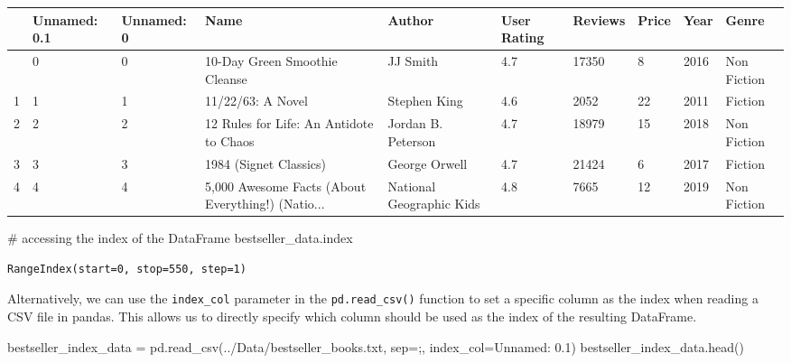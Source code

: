 \documentclass[
  letterpaper,
  DIV=11,
  numbers=noendperiod]{scrreprt}
\newenvironment{Shaded}{\begin{snugshade}}{\end{snugshade}}
\newcommand{\CommentTok}[1]{\textcolor[rgb]{0.37,0.37,0.37}{#1}}
\newcommand{\NormalTok}[1]{\textcolor[rgb]{0.00,0.23,0.31}{#1}}
\newcommand{\OperatorTok}[1]{\textcolor[rgb]{0.37,0.37,0.37}{#1}}
\newcommand{\StringTok}[1]{\textcolor[rgb]{0.13,0.47,0.30}{#1}}
\begin{document}
\begin{longtable}[]{@{}llllllllll@{}}
\toprule\noalign{}
& Unnamed: 0.1 & Unnamed: 0 & Name & Author & User Rating & Reviews &
Price & Year & Genre \\
\midrule\noalign{}
\endhead
\bottomrule\noalign{}
\endlastfoot
0 & 0 & 0 & 10-Day Green Smoothie Cleanse & JJ Smith & 4.7 & 17350 & 8 &
2016 & Non Fiction \\
1 & 1 & 1 & 11/22/63: A Novel & Stephen King & 4.6 & 2052 & 22 & 2011 &
Fiction \\
2 & 2 & 2 & 12 Rules for Life: An Antidote to Chaos & Jordan B. Peterson
& 4.7 & 18979 & 15 & 2018 & Non Fiction \\
3 & 3 & 3 & 1984 (Signet Classics) & George Orwell & 4.7 & 21424 & 6 &
2017 & Fiction \\
4 & 4 & 4 & 5,000 Awesome Facts (About Everything!) (Natio... & National
Geographic Kids & 4.8 & 7665 & 12 & 2019 & Non Fiction \\
\end{longtable}

\begin{Shaded}
\begin{Highlighting}[]
\CommentTok{\# accessing the index of the DataFrame}
\NormalTok{bestseller\_data.index}
\end{Highlighting}
\end{Shaded}

\begin{verbatim}
RangeIndex(start=0, stop=550, step=1)
\end{verbatim}

Alternatively, we can use the \texttt{index\_col} parameter in the
\texttt{pd.read\_csv()} function to set a specific column as the index
when reading a CSV file in pandas. This allows us to directly specify
which column should be used as the index of the resulting DataFrame.

\begin{Shaded}
\begin{Highlighting}[]
\NormalTok{bestseller\_index\_data }\OperatorTok{=}\NormalTok{ pd.read\_csv(}\StringTok{\textquotesingle{}../Data/bestseller\_books.txt\textquotesingle{}}\NormalTok{, sep}\OperatorTok{=}\StringTok{\textquotesingle{};\textquotesingle{}}\NormalTok{, index\_col}\OperatorTok{=}\StringTok{\textquotesingle{}Unnamed: 0.1\textquotesingle{}}\NormalTok{)}
\NormalTok{bestseller\_index\_data.head()}
\end{Highlighting}
\end{Shaded}
\end{document}
